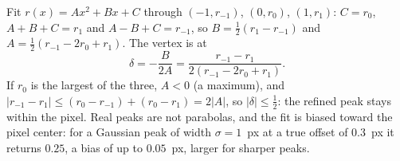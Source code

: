\begin{solutions}
  \item Fit $r(x) = Ax^2 + Bx + C$ through $(-1, r_{-1})$, $(0, r_0)$, $(1, r_1)$: $C = r_0$, $A + B + C = r_1$ and $A - B + C = r_{-1}$, so
        $B = \tfrac12(r_1 - r_{-1})$ and $A = \tfrac12(r_{-1} - 2r_0 + r_1)$. The vertex is at
        \[
          \delta = -\frac{B}{2A} = \frac{r_{-1} - r_1}{2(r_{-1} - 2r_0 + r_1)} .
        \]
        If $r_0$ is the largest of the three, $A < 0$ (a maximum), and $|r_{-1} - r_1| \le (r_0 - r_{-1}) + (r_0 - r_1) = 2|A|$, so $|\delta| \le \tfrac12$: the refined peak stays within
        the pixel. Real peaks are not parabolas, and the fit is biased toward the pixel center: for a Gaussian peak of width $\sigma = 1$~px at a true
        offset of $0.3$~px it returns $0.25$, a bias of up to $0.05$~px, larger for sharper peaks.
\end{solutions}
